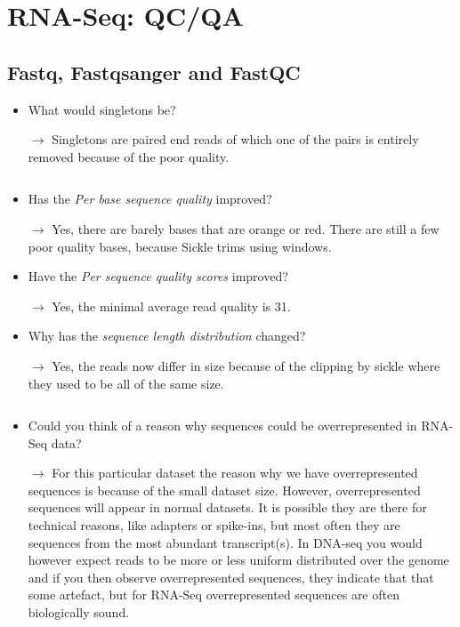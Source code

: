 \section{RNA-Seq: QC/QA}

\subsection{Fastq, Fastqsanger and FastQC}

\begin{itemize}
	\item What would singletons be?
	\item[$\rightarrow$] Singletons are paired end reads of which one of the pairs is entirely removed because of the poor quality.
	\item[$$]
	\item Has the \textit{Per base sequence quality} improved?
	\item[$\rightarrow$] Yes, there are barely bases that are orange or red. There are still a few poor quality bases, because Sickle trims using windows.
	\item Have the \textit{Per sequence quality scores} improved?
	\item[$\rightarrow$] Yes, the minimal average read quality is 31.
	\item Why has the \textit{sequence length distribution} changed?
	\item[$\rightarrow$] Yes, the reads now differ in size because of the clipping by sickle where they used to be all of the same size.
	\item[$$]
	\item Could you think of a reason why sequences could be overrepresented in RNA-Seq data?
	\item[$\rightarrow$] For this particular dataset the reason why we have overrepresented sequences is because of the small dataset size.
	However, overrepresented sequences will appear in normal datasets.
	It is possible they are there for technical reasons, like adapters or spike-ins, but most often they are sequences from the most abundant transcript(s).
	In DNA-seq you would however expect reads to be more or less uniform distributed over the genome and if you then observe overrepresented sequences, they indicate that that some artefact, but for RNA-Seq overrepresented sequences are often biologically sound.
\end{itemize}
